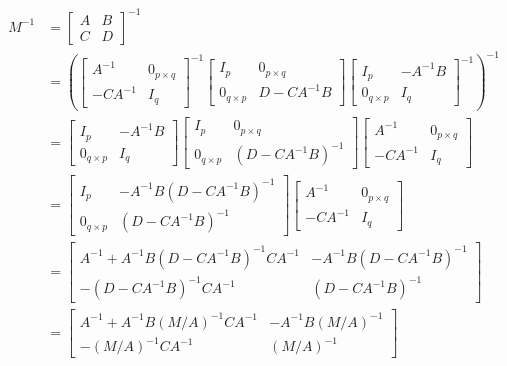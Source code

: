 \begin{align*}
M^{-1} &=
\begin{bmatrix}
A & B \\
C & D
\end{bmatrix}^{-1} \\
&= \left(\begin{bmatrix}
A^{-1} & 0_{p\times q} \\
-CA^{-1} & I_q
\end{bmatrix}^{-1}
\begin{bmatrix}
I_p & 0_{p \times q} \\
0_{q\times p} & D - CA^{-1}B 
\end{bmatrix}
\begin{bmatrix}
I_p & -A^{-1}B \\
0_{q \times p} & I_q
\end{bmatrix}^{-1} \right)^{-1} \\
&=
\begin{bmatrix}
I_p & -A^{-1}B \\
0_{q \times p} & I_q
\end{bmatrix} 
\begin{bmatrix}
I_p & 0_{p \times q} \\
0_{q\times p} & (D - CA^{-1}B)^{-1}
\end{bmatrix}
\begin{bmatrix}
A^{-1} & 0_{p\times q} \\
-CA^{-1} & I_q
\end{bmatrix} \\
&=
\begin{bmatrix}
I_p & -A^{-1}B (D - CA^{-1}B)^{-1} \\
0_{q \times p} & (D - CA^{-1}B)^{-1}
\end{bmatrix}
\begin{bmatrix}
A^{-1} & 0_{p\times q} \\
-CA^{-1} & I_q
\end{bmatrix} \\
&= \begin{bmatrix}
A^{-1} + A^{-1}B (D - CA^{-1}B)^{-1} CA^{-1} & -A^{-1}B (D - CA^{-1}B)^{-1} \\
-(D - CA^{-1}B)^{-1}CA^{-1} & (D - CA^{-1}B)^{-1}
\end{bmatrix} \\
&= \begin{bmatrix}
A^{-1} + A^{-1}B (M/A)^{-1} CA^{-1} & -A^{-1}B (M/A)^{-1} \\
-(M/A)^{-1}CA^{-1} & (M/A)^{-1}
\end{bmatrix}
\end{align*}
